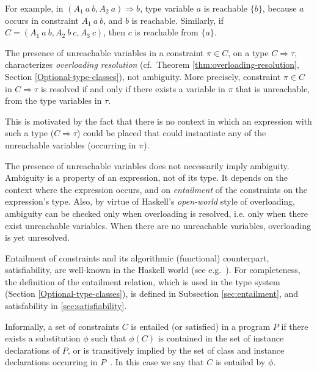 For example, in $(A_1\: a\: b, A_2\: a) \Rightarrow b$, type variable
$a$ is reachable $\{b\}$, because $a$ occurs in constraint $A_1\: a\:
b$, and $b$ is reachable. Similarly, if $C = (A_1\: a\: b, A_2\: b\:
c, A_3\: c)$, then $c$ is reachable from $\{a\}$.

The presence of unreachable variables in a constraint $\pi\in C$, on a
type $C \Rightarrow \tau$, characterizes {\em overloading
  resolution\/} (cf.~Theorem \ref{thm:overloading-resolution}, Section
\ref{Optional-type-classes}), not ambiguity. More precisely,
constraint $\pi \in C$ in $C\Rightarrow \tau$ is resolved if and only
if there exists a variable in $\pi$ that is unreachable, from the type
variables in $\tau$.

This is motivated by the fact that there is no context in which an
expression with such a type ($C\Rightarrow \tau$) could be placed that
could instantiate any of the unreachable variables (occurring in
$\pi$).

The presence of unreachable variables does not necessarily imply
ambiguity. Ambiguity is a property of an expression, not of its
type. It depends on the context where the expression occurs, and on
\textit{entailment\/} of the constraints on the expression's type.
Also, by virtue of Haskell's {\em open-world\/} style of overloading,
ambiguity can be checked only when overloading is resolved, i.e. only
when there exist unreachable variables. When there are no unreachable
variables, overloading is yet unresolved.


Entailment of constraints and its algorithmic (functional)
counterpart, satisfiability, are well-known in the Haskell world (see
e.g.~\cite{MarkJones94a,TheoryOfOverloading,JBCS-Ambiguity-and-constrained-polymorphism}).
For completeness, the definition of the entailment relation, which is
used in the type system (Section \ref{Optional-type-classes}), is
defined in Subsection \ref{sec:entailment}, and satisfability in
\ref{sec:satisfiability}.

Informally, a set of constraints $C$ is entailed (or satisfied) in a
program $P$ if there exists a substitution $\phi$ such that $\phi(C)$
is contained in the set of instance declarations of $P$, or is
transitively implied by the set of class and instance declarations
occurring in
$P$~\cite{MarkJones94a,JBCS-Ambiguity-and-constrained-polymorphism}. In
this case we say that $C$ is entailed by $\phi$.

